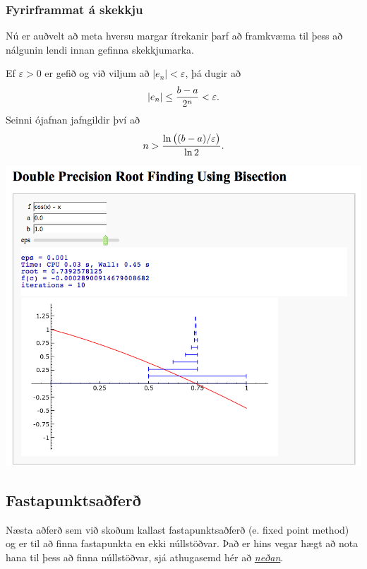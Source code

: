 \documentclass[a4paper,10pt,icelandic]{sphinxmanual}
\begin{document}
\subsubsection{Fyrirframmat á skekkju}
\label{kafli02:fyrirframmat-a-skekkju}
Nú er auðvelt að meta hversu margar ítrekanir þarf að framkvæma til þess
að nálgunin lendi innan gefinna skekkjumarka.

Ef \(\varepsilon>0\) er gefið og við viljum að
\(|e_n|< \varepsilon\), þá dugir að
\begin{gather}
\begin{split}|e_n|\leq \dfrac{b-a}{2^{n}} <\varepsilon.\end{split}\notag
\end{gather}
Seinni ójafnan jafngildir því að
\begin{gather}
\begin{split}n>\dfrac{\ln\big((b-a)/\varepsilon\big)}{\ln 2}.\end{split}\notag
\end{gather}

\begin{center}
\includegraphics[width=8 cm,keepaspectratio=true]{bisection.png}

\end{center}

\subsection{Fastapunktsaðferð}
\label{kafli02:index-2}\label{kafli02:fastapunktsafer}
Næsta aðferð sem við skoðum kallast fastapunktsaðferð (e. fixed point method) og
er til að finna fastapunkta en ekki núllstöðvar. Það er hins vegar hægt að
nota hana til þess að finna núllstöðvar, sjá athugasemd hér að {\hyperref[kafli02:fastapunktar-nullstodvar]{\emph{neðan}}}.
\end{document}
